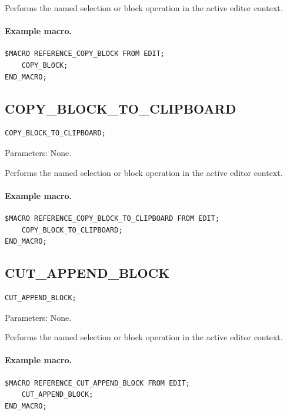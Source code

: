 \documentclass[a4paper,10pt,twoside,openany]{book}
\newenvironment{mrmacextension}{\begin{changebar}}{\end{changebar}}
\begin{document}
Performs the named selection or block operation in the active editor context.

\paragraph{Example macro.}
\begin{verbatim}
$MACRO REFERENCE_COPY_BLOCK FROM EDIT;
    COPY_BLOCK;
END_MACRO;
\end{verbatim}

\begin{mrmacextension}
\label{prim:procedure-copy-block-to-clipboard}
\subsection*{COPY\_BLOCK\_TO\_CLIPBOARD}
\begin{verbatim}
COPY_BLOCK_TO_CLIPBOARD;
\end{verbatim}
Parameters: None.

Performs the named selection or block operation in the active editor context.

\paragraph{Example macro.}
\begin{verbatim}
$MACRO REFERENCE_COPY_BLOCK_TO_CLIPBOARD FROM EDIT;
    COPY_BLOCK_TO_CLIPBOARD;
END_MACRO;
\end{verbatim}
\end{mrmacextension}

\begin{mrmacextension}
\label{prim:procedure-cut-append-block}
\subsection*{CUT\_APPEND\_BLOCK}
\begin{verbatim}
CUT_APPEND_BLOCK;
\end{verbatim}
Parameters: None.

Performs the named selection or block operation in the active editor context.

\paragraph{Example macro.}
\begin{verbatim}
$MACRO REFERENCE_CUT_APPEND_BLOCK FROM EDIT;
    CUT_APPEND_BLOCK;
END_MACRO;
\end{verbatim}
\end{mrmacextension}
\end{document}
